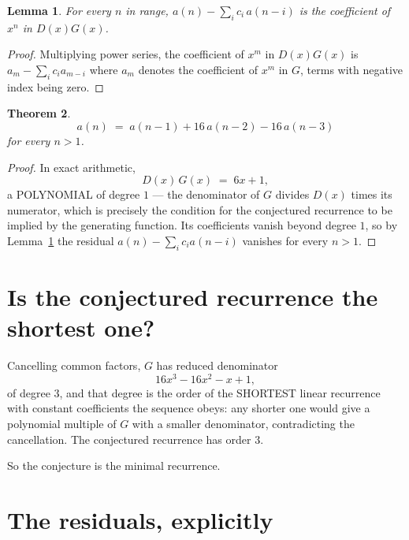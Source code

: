 \documentclass[11pt,a4paper]{article}
\theoremstyle{plain}
\newtheorem{theorem}{Theorem}
\newtheorem{lemma}[theorem]{Lemma}
\theoremstyle{definition}
\begin{document}
\begin{lemma}\label{lem:key}
For every $n$ in range, $a(n)-\sum_i c_i\,a(n-i)$ is the coefficient of $x^{n}$ in
$D(x)G(x)$.
\end{lemma}

\begin{proof}
Multiplying power series, the coefficient of $x^{m}$ in $D(x)G(x)$ is
$a_m-\sum_i c_i a_{m-i}$ where $a_m$ denotes the coefficient of $x^{m}$ in $G$, terms with
negative index being zero.
\end{proof}

\begin{theorem}
\[
a(n)\;=\;a(n-1) + 16\,a(n-2) - 16\,a(n-3)
\]
for every $n>1$.
\end{theorem}

\begin{proof}
In exact arithmetic,
\[
D(x)\,G(x)\;=\;6 x + 1,
\]
a POLYNOMIAL of degree $1$ --- the denominator of $G$ divides $D(x)$ times its numerator,
which is precisely the condition for the conjectured recurrence to be implied by the
generating function. Its coefficients vanish beyond degree $1$, so by
Lemma~\ref{lem:key} the residual $a(n)-\sum_ic_ia(n-i)$ vanishes for every
$n>1$.
\end{proof}

\section{Is the conjectured recurrence the shortest one?}

Cancelling common factors, $G$ has reduced denominator
\[
16 x^{3} - 16 x^{2} - x + 1,
\]
of degree $3$, and that degree is the order of the SHORTEST linear recurrence with
constant coefficients the sequence obeys: any shorter one would give a polynomial multiple of
$G$ with a smaller denominator, contradicting the cancellation. The conjectured recurrence has
order $3$.

So the conjecture is the minimal recurrence.

\section{The residuals, explicitly}
\end{document}
